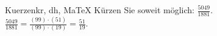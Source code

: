 \begin{MAufgabe}{Kuerzen}{kr, dh, MaTeX}
K\"urzen Sie soweit m\"oglich: $\frac{5049}{1881}$.\\ 
\ifLsg\MLoesung
\quad $\frac{5049}{1881}=\frac{(99)\cdot(51)}{(99)\cdot(19)}=\frac{51}{19}$.\else\relax\fi
 \end{MAufgabe}